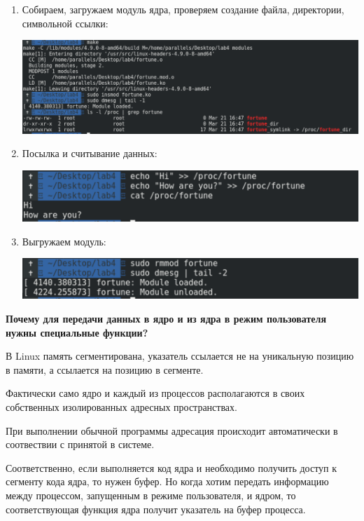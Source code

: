 \documentclass[a4paper,14pt]{extreport} %
\begin{document}
\begin{enumerate}
\item Собираем, загружаем модуль ядра, проверяем создание файла, директории, символьной ссылки:

\includegraphics[scale=0.45]{images/insmod}

\item Посылка и считывание данных:

\includegraphics[scale=0.45]{images/cat}

\item Выгружаем модуль:

\includegraphics[scale=0.45]{images/rmmod}

\end{enumerate}

\textbf{Почему для передачи данных в ядро и из ядра в режим пользователя нужны специальные функции?}

В Linux память сегментирована, указатель ссылается не на уникальную позицию в памяти, а ссылается на позицию в сегменте. 

Фактически само ядро и каждый из процессов располагаются в своих собственных изолированных адресных пространствах.

При выполнении обычной программы адресация происходит автоматически в соотвествии с принятой в системе. 

Соответственно, если выполняется код ядра и необходимо получить доступ к сегменту кода ядра, то нужен буфер. Но когда хотим передать информацию между процессом, запущенным в режиме пользователя, и ядром, то соответствующая функция ядра получит указатель на буфер процесса. 
\end{document}
